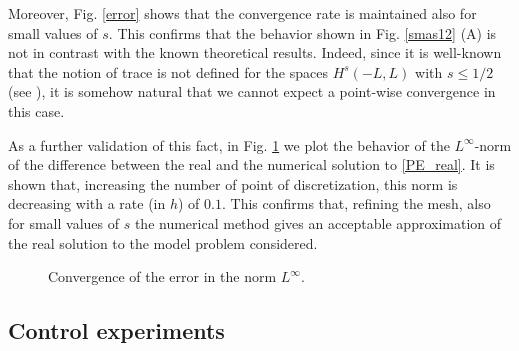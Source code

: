 Moreover, Fig.  \ref{error} shows that the convergence rate is maintained also for small values of $s$. This confirms that the behavior shown in Fig. \ref{smas12} (A) is not in contrast with the known theoretical results. Indeed, since it is well-known that the notion of trace is not defined for the spaces $H^s(-L,L)$ with $s\leq 1/2$ (see \cite{lions1968problemes,tartar2007introduction}), it is somehow natural that we cannot expect a point-wise convergence in this case.  

As a further validation of this fact, in Fig.  \ref{linfty_error} we plot the behavior of the $L^{\infty}$-norm of the difference between the real and the numerical solution to \eqref{PE_real}. It is shown that, increasing the number of point of discretization, this norm is decreasing with a rate (in $h$) of $0.1$. This confirms that, refining the mesh, also for small values of $s$ the numerical method gives an acceptable approximation of the real solution to the model problem considered.   

\begin{figure}[!h]
\centering

\caption{Convergence of the error in the norm $L^\infty$.}\label{linfty_error}
\end{figure}


\subsection{Control experiments}\label{control_exp}

